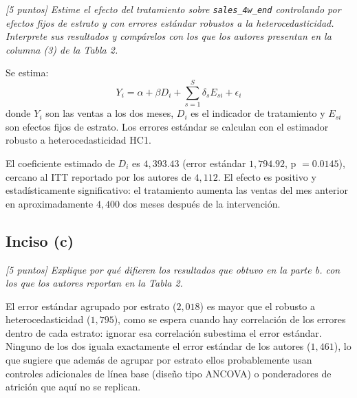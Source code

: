 \documentclass[12pt]{article}
\begin{document}
\textit{[5 puntos] Estime el efecto del tratamiento sobre \texttt{sales\_4w\_end} controlando por efectos fijos de estrato y con errores estándar robustos a la heterocedasticidad. Interprete sus resultados y compárelos con los que los autores presentan en la columna (3) de la Tabla 2.}

Se estima:
\begin{equation}
Y_i = \alpha + \beta D_i + \sum_{s=1}^{S} \delta_s E_{si} + \epsilon_i
\end{equation}
donde $Y_i$ son las ventas a los dos meses, $D_i$ es el indicador de tratamiento y $E_{si}$ son efectos fijos de estrato. Los errores estándar se calculan con el estimador robusto a heterocedasticidad HC1.



El coeficiente estimado de $D_i$ es $4{,}393.43$ (error estándar $1{,}794.92$, p $= 0.0145$), cercano al ITT reportado por los autores de $4{,}112$. El efecto es positivo y estadísticamente significativo: el tratamiento aumenta las ventas del mes anterior en aproximadamente $4{,}400$ dos meses después de la intervención.

\subsection*{Inciso (c)}

\textit{[5 puntos] Explique por qué difieren los resultados que obtuvo en la parte b. con los que los autores reportan en la Tabla 2.}



El error estándar agrupado por estrato ($2{,}018$) es mayor que el robusto a heterocedasticidad ($1{,}795$), como se espera cuando hay correlación de los errores dentro de cada estrato: ignorar esa correlación subestima el error estándar. Ninguno de los dos iguala exactamente el error estándar de los autores ($1{,}461$), lo que sugiere que además de agrupar por estrato ellos probablemente usan controles adicionales de línea base (diseño tipo ANCOVA) o ponderadores de atrición que aquí no se replican.
\end{document}
